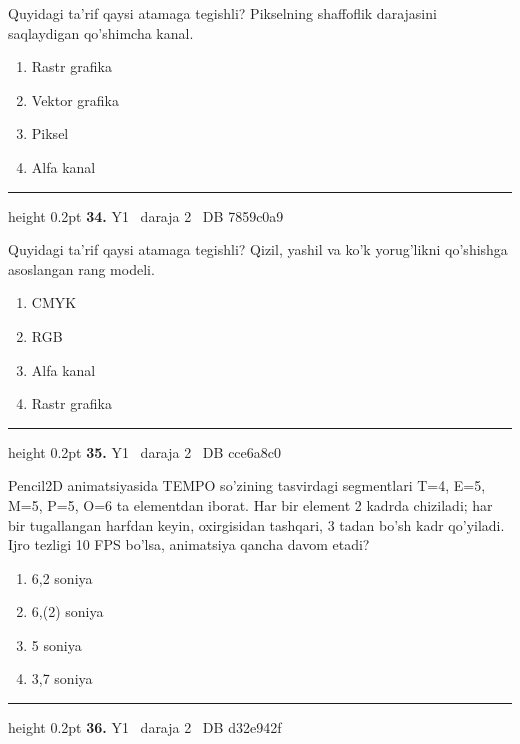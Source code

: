 \documentclass[10pt,a4paper,oneside]{article}
\begin{document}
\par
Quyidagi ta'rif qaysi atamaga tegishli? Pikselning shaffoflik darajasini saqlaydigan qo'shimcha kanal.
\begin{enumerate}[label=\Alph*),leftmargin=9mm]
\item Rastr grafika
\item Vektor grafika
\item Piksel
\item Alfa kanal
\end{enumerate}
\vspace{2mm}\hrule height 0.2pt \vspace{4mm}
\hypertarget{q34}{\textbf{\color{ink}34.}}  {\color{muted}\scriptsize Y1 \textbullet\ daraja 2 \textbullet\ DB 7859c0a9}
\par
Quyidagi ta'rif qaysi atamaga tegishli? Qizil, yashil va ko'k yorug'likni qo'shishga asoslangan rang modeli.
\begin{enumerate}[label=\Alph*),leftmargin=9mm]
\item CMYK
\item RGB
\item Alfa kanal
\item Rastr grafika
\end{enumerate}
\vspace{2mm}\hrule height 0.2pt \vspace{4mm}
\hypertarget{q35}{\textbf{\color{ink}35.}}  {\color{muted}\scriptsize Y1 \textbullet\ daraja 2 \textbullet\ DB cce6a8c0}
\par
Pencil2D animatsiyasida TEMPO so'zining tasvirdagi segmentlari T=4, E=5, M=5, P=5, O=6 ta elementdan iborat. Har bir element 2 kadrda chiziladi; har bir tugallangan harfdan keyin, oxirgisidan tashqari, 3 tadan bo'sh kadr qo'yiladi. Ijro tezligi 10 FPS bo'lsa, animatsiya qancha davom etadi?
\begin{enumerate}[label=\Alph*),leftmargin=9mm]
\item 6,2 soniya
\item 6,(2) soniya
\item 5 soniya
\item 3,7 soniya
\end{enumerate}
\vspace{2mm}\hrule height 0.2pt \vspace{4mm}
\hypertarget{q36}{\textbf{\color{ink}36.}}  {\color{muted}\scriptsize Y1 \textbullet\ daraja 2 \textbullet\ DB d32e942f}
\par
\end{document}
